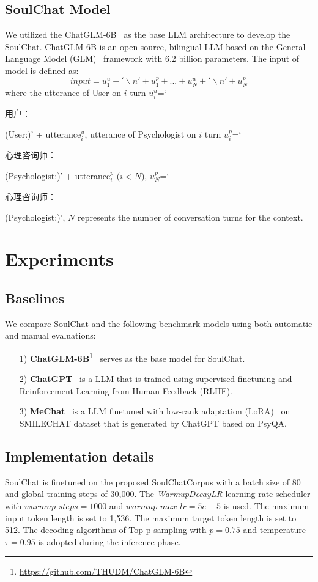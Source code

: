 \documentclass[11pt]{article}
\begin{document}
\subsection{SoulChat Model}
We utilized the ChatGLM-6B~\citep{du-etal-2022-glm, zeng2023glm-130b} as the base LLM architecture to develop the SoulChat. ChatGLM-6B is an open-source, bilingual LLM based on the General Language Model (GLM)~\citep{du-etal-2022-glm} framework with 6.2 billion parameters. The input of model is defined as: 
$$
input = u_1^u+'{\backslash}n'+u_1^p+ ...+u_N^u+'{\backslash}n'+u_N^p
$$
where the utterance of User on $i$ turn $u_i^u$=`\begin{CJK}{UTF8}{gbsn}用户：\end{CJK} (User:)' + utterance$_{i}^u$,  utterance of Psychologist on $i$ turn $u_i^p$=`\begin{CJK}{UTF8}{gbsn}心理咨询师：\end{CJK} (Psychologist:)' + utterance$_{i}^p$ ($i<N$), $u_N^p$=`\begin{CJK}{UTF8}{gbsn}心理咨询师：\end{CJK} (Psychologist:)', $N$
represents the number of conversation turns for the context.

\section{Experiments}
\label{sec:experiments}
\subsection{Baselines}
We compare SoulChat and the following benchmark models using both automatic and manual evaluations:
\begin{itemize}
  \item [1)]
  \textbf{ChatGLM-6B}\footnote{\url{https://github.com/THUDM/ChatGLM-6B}}~\citep{du-etal-2022-glm, zeng2023glm-130b} serves as the base model for SoulChat.
  \item [2)]
  \textbf{ChatGPT}~\citep{chatgpt, instructgpt} is a LLM that is trained using supervised finetuning and Reinforcement Learning from Human Feedback (RLHF).
  \item [3)]
  \textbf{MeChat}~\citep{qiu2023smile} is a LLM finetuned with low-rank adaptation (LoRA)~\citep{hu2022lora} on SMILECHAT dataset that is generated by ChatGPT based on PsyQA.
  
\end{itemize}

\subsection{Implementation details}
SoulChat is finetuned on the proposed SoulChatCorpus with a batch size of 80 and global training steps of 30,000. The \textit{WarmupDecayLR} learning rate scheduler with $warmup\_steps = 1000$ and $warmup\_max\_lr=5e-5$ is used. The maximum input token length is set to 1,536. The maximum target token length is set to 512. The decoding algorithms of Top-p sampling with $p=0.75$ and temperature $\tau=0.95$ is adopted during the inference phase.
\end{document}
